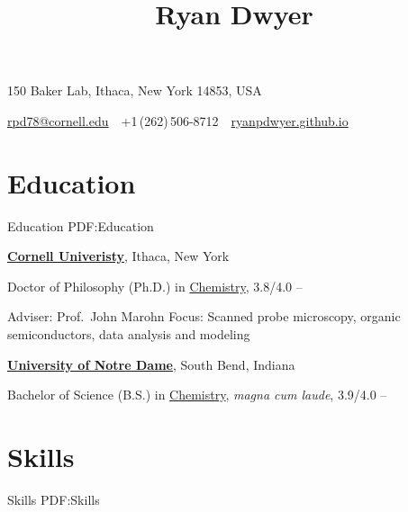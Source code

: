 \documentclass[letterpaper,MMMyyyy,nonstop]{simpleresumecv}
\newcommand{\CVAuthor}{Ryan Dwyer}
\newcommand{\CVWebpage}{ryanpdwyer.github.io}
\begin{document}

\title{\CVAuthor}

\begin{subtitle}
150 Baker Lab, Ithaca, New York 14853, USA
\par
\href{mailto:rpd78@cornell.edu}
{rpd78@cornell.edu}
\,\SubBulletSymbol\,
+1\,(262)\,506-8712
\,\SubBulletSymbol\,
\href{\CVWebpage}
{\CVWebpage}
\end{subtitle}

\begin{body}


\section
{Education}
{Education}
{PDF:Education}

\href{http://www.cornell.edu}
{\textbf{Cornell Univeristy}},
Ithaca, New York

\GapNoBreak
\BulletItem
Doctor of Philosophy (Ph.D.) in
\href{http://chem.cornell.edu}
{Chemistry}, 3.8/4.0
\hfill
{} --
\begin{detail}
\SubBulletItem
Adviser:
Prof.~John Marohn
\SubBulletItem
Focus:
Scanned probe microscopy, organic semiconductors, data analysis and modeling
\end{detail}

\BigGap
\href{https://www.nd.edu}
{\textbf{University of Notre Dame}},
South Bend, Indiana

\GapNoBreak
\BulletItem
Bachelor of Science (B.S.) in
\href{http://chemistry.nd.edu}
{Chemistry}, \emph{magna cum laude}, 3.9/4.0
\hfill
{} --



\section
{Skills}
{Skills}
{PDF:Skills}

% 






\end{body}
\end{document}
